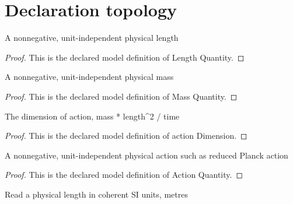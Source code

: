 \section{Declaration topology}
\begin{definition}
  \label{def:physics:phyx-mini-0603:phyxminiproblems-problemphyxmini0603-lengthquantity}
  A nonnegative, unit-independent physical length
\end{definition}
\begin{proof}
  This is the declared model definition of Length Quantity.
\end{proof}
\begin{definition}
  \label{def:physics:phyx-mini-0603:phyxminiproblems-problemphyxmini0603-massquantity}
  A nonnegative, unit-independent physical mass
\end{definition}
\begin{proof}
  This is the declared model definition of Mass Quantity.
\end{proof}
\begin{definition}
  \label{def:physics:phyx-mini-0603:phyxminiproblems-problemphyxmini0603-actiondimension}
  The dimension of action, mass * length\textasciicircum{}2 / time
\end{definition}
\begin{proof}
  This is the declared model definition of action Dimension.
\end{proof}
\begin{definition}
  \label{def:physics:phyx-mini-0603:phyxminiproblems-problemphyxmini0603-actionquantity}
  A nonnegative, unit-independent physical action such as reduced Planck action
\end{definition}
\begin{proof}
  This is the declared model definition of Action Quantity.
\end{proof}
\begin{definition}
  \label{def:physics:phyx-mini-0603:phyxminiproblems-problemphyxmini0603-lengthinmeters}
  Read a physical length in coherent SI units, metres
\end{definition}
